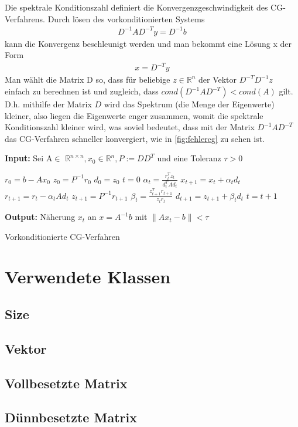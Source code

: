 \documentclass[12pt,a4paper]{scrartcl}
\numberwithin{equation}{section}
\numberwithin{myalgctr}{section}
\numberwithin{mytheoremctr}{subsection}
\numberwithin{mykorollarctr}{subsection}
\numberwithin{mylemmactr}{subsection}
\numberwithin{mybeispielctr}{subsection}
\newcommand\norm[1]{\left\lVert#1\right\rVert}
\begin{document}
	
	Die spektrale Konditionszahl definiert die Konvergenzgeschwindigkeit des CG-Verfahrens. Durch lösen des vorkonditionierten Systems
	\begin{align*}
		D^{-1}AD^{-T}y = D^{-1}b
	\end{align*}
	kann die Konvergenz beschleunigt werden und man bekommt eine Lösung x der Form 
	\begin{align*}
		x = D^{-T}y
	\end{align*}
	Man wählt die Matrix D so, dass für beliebige $z \in \mathbb{R}^{n}$ der Vektor $D^{-T}D^{-1}z$ einfach zu berechnen ist und zugleich, dass $cond(D^{-1}AD^{-T}) < cond(A)$ gilt. D.h. mithilfe der Matrix $D$ wird das Spektrum (die Menge der Eigenwerte) kleiner, also liegen die Eigenwerte enger zusammen, womit die spektrale Konditionszahl kleiner wird, was soviel bedeutet, dass mit der Matrix $D^{-1}AD^{-T}$ das CG-Verfahren schneller konvergiert, wie in \cref{fig:fehlercg} zu sehen ist. 
	\begin{algorithm}[H]
		\textbf{Input:} Sei A$\in$ $\mathbb{R}^{n\times n}, x_0 \in \mathbb{R}^{n}, P:=DD^{T}$ und eine Toleranz $\tau > 0$
		\begin{algorithmic}[1]
			\State $r_0 = b - Ax_0$
			\State $z_0 = P^{-1}r_0$
			\State $d_0 = z_0$
			\State $t = 0$
			\While{$ \norm{r_t} > \tau $}
			\State $\alpha_t = \frac{r_t^{T}z_t}{d_t^{T}Ad_t}$
			\State $x_{t+1} = x_{t} + \alpha_t d_t$
			\State $r_{t+1} = r_t - \alpha_t Ad_t$
			\State $z_{t+1} = P^{-1}r_{t+1}$
			\State $\beta_t = \frac{z_{t+1}^{T}r_{t+1}}{z_tr_t}$
			\State $d_{t+1} = z_{t+1} + \beta_td_t$
			\State $t = t + 1$
			\EndWhile
		\end{algorithmic}
		\textbf{Output:} Näherung $x_t$ an $x = A^{-1}b$ mit $\norm{Ax_t-b} < \tau$
		
		\caption{Vorkonditionierte CG-Verfahren} \label{alg:vcg}
	\end{algorithm}
	
	\newpage
	\appendix
	\section{Verwendete Klassen}
	\subsection{Size}
	
	\subsection{Vektor}
	
	\subsection{Vollbesetzte Matrix}
	
	\subsection{D\"unnbesetzte Matrix}
	
	
	\newpage
	\printbibliography
	\lstlistoflistings
	\listoffigures
	\thispagestyle{firststyle}
	
\end{document}
